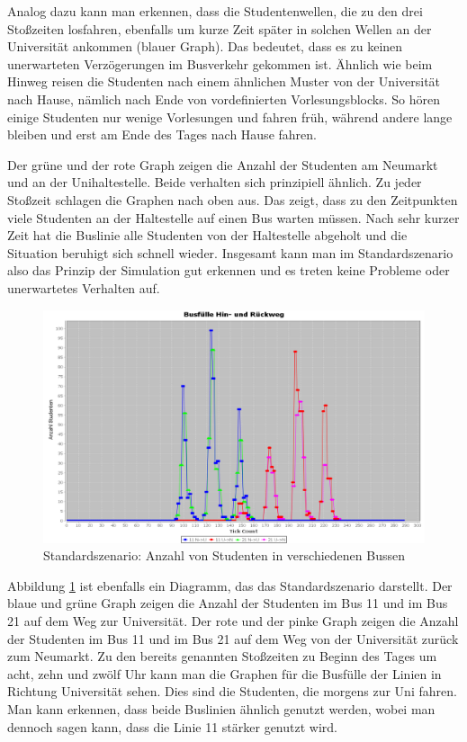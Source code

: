\documentclass[12pt,a4paper]{scrartcl}
\begin{document}
Analog dazu kann man erkennen, dass die Studentenwellen, die zu den drei Stoßzeiten losfahren, ebenfalls um kurze Zeit später in solchen Wellen an der Universität ankommen (blauer Graph). Das bedeutet, dass es zu keinen unerwarteten Verzögerungen im Busverkehr gekommen ist. Ähnlich wie beim Hinweg reisen die Studenten nach einem ähnlichen Muster von der Universität nach Hause, nämlich nach Ende von vordefinierten Vorlesungsblocks. So hören einige Studenten nur wenige Vorlesungen und fahren früh, während andere lange bleiben und erst am Ende des Tages nach Hause fahren. 

Der grüne und der rote Graph zeigen die Anzahl der Studenten am Neumarkt und an der Unihaltestelle. Beide verhalten sich prinzipiell ähnlich. Zu jeder Stoßzeit schlagen die Graphen nach oben aus. Das zeigt, dass zu den Zeitpunkten viele Studenten an der Haltestelle auf einen Bus warten müssen. Nach sehr kurzer Zeit hat die Buslinie alle Studenten von der Haltestelle abgeholt und die Situation beruhigt sich schnell wieder.
Insgesamt kann man im Standardszenario also das Prinzip der Simulation gut erkennen und es treten keine Probleme oder unerwartetes Verhalten auf.

\begin{figure}
\includegraphics[scale=0.4]{Standardszenario_Busse.png}
\caption{Standardszenario: Anzahl von Studenten in verschiedenen Bussen}
\label{s1g2}
\end{figure}

Abbildung \ref{s1g2} ist ebenfalls ein Diagramm, das das Standardszenario darstellt. Der blaue und grüne Graph zeigen die Anzahl der Studenten im Bus 11 und im Bus 21 auf dem Weg zur Universität. Der rote und der pinke Graph zeigen die Anzahl der Studenten im Bus 11 und im Bus 21 auf dem Weg von der Universität zurück zum Neumarkt. Zu den bereits genannten Stoßzeiten zu Beginn des Tages um acht, zehn und zwölf Uhr kann man die Graphen für die Busfülle der Linien in Richtung Universität sehen. Dies sind die Studenten, die morgens zur Uni fahren. Man kann erkennen, dass beide Buslinien ähnlich genutzt werden, wobei man dennoch sagen kann, dass die Linie 11 stärker genutzt wird. 
\end{document}
